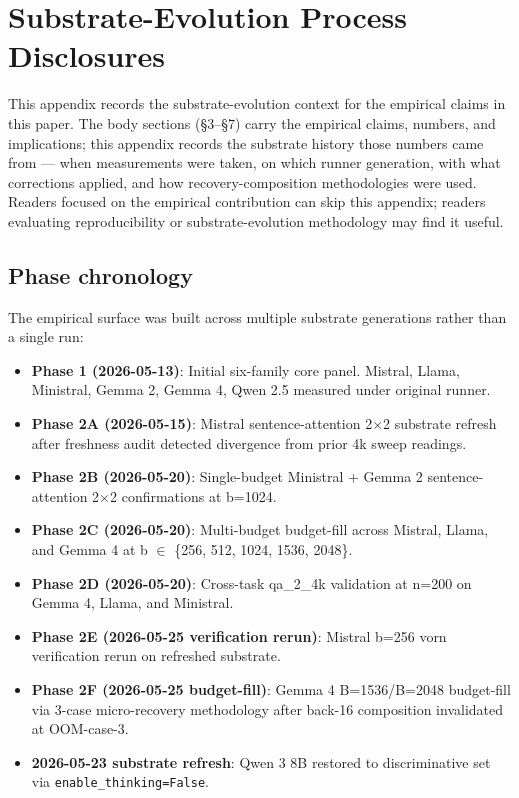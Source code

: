 \documentclass[10pt]{article}
\providecommand{\tightlist}{%
 \setlength{\itemsep}{0pt}\setlength{\parskip}{0pt}}
\begin{document}
\section{Substrate-Evolution Process Disclosures}\label{appendix-c-substrate-evolution-process-disclosures}

This appendix records the substrate-evolution context for the empirical
claims in this paper. The body sections (\S3--\S7) carry the empirical
claims, numbers, and implications; this appendix records the substrate
history those numbers came from --- when measurements were taken, on
which runner generation, with what corrections applied, and how
recovery-composition methodologies were used. Readers focused on the
empirical contribution can skip this appendix; readers evaluating
reproducibility or substrate-evolution methodology may find it useful.

\subsection{Phase chronology}\label{c-1-phase-chronology}

The empirical surface was built across multiple substrate generations
rather than a single run:

\begin{itemize}
\tightlist
\item
 \textbf{Phase 1 (2026-05-13)}: Initial six-family core panel. Mistral,
 Llama, Ministral, Gemma 2, Gemma 4, Qwen 2.5 measured under original
 runner.
\item
 \textbf{Phase 2A (2026-05-15)}: Mistral sentence-attention 2$\times$2
 substrate refresh after freshness audit detected divergence from prior
 4k sweep readings.
\item
 \textbf{Phase 2B (2026-05-20)}: Single-budget Ministral + Gemma 2
 sentence-attention 2$\times$2 confirmations at b=1024.
\item
 \textbf{Phase 2C (2026-05-20)}: Multi-budget budget-fill across
 Mistral, Llama, and Gemma 4 at b $\in$ \{256, 512, 1024, 1536, 2048\}.
\item
 \textbf{Phase 2D (2026-05-20)}: Cross-task qa\_2\_4k validation at
 n=200 on Gemma 4, Llama, and Ministral.
\item
 \textbf{Phase 2E (2026-05-25 verification rerun)}: Mistral b=256 vorn
 verification rerun on refreshed substrate.
\item
 \textbf{Phase 2F (2026-05-25 budget-fill)}: Gemma 4 B=1536/B=2048
 budget-fill via 3-case micro-recovery methodology after back-16
 composition invalidated at OOM-case-3.
\item
 \textbf{2026-05-23 substrate refresh}: Qwen 3 8B restored to
 discriminative set via \texttt{enable\_thinking=False}.
\end{itemize}
\end{document}

